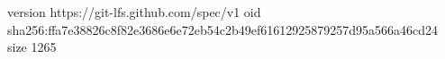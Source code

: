 version https://git-lfs.github.com/spec/v1
oid sha256:ffa7e38826c8f82e3686e6e72eb54c2b49ef61612925879257d95a566a46cd24
size 1265
